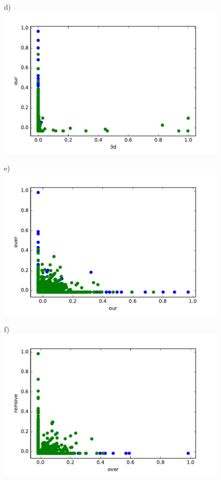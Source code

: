 \documentclass[11pt, paper=a4]{article}
\begin{document}
\begin{figure}[h]
\begin{minipage}{0.3\textwidth}
  \end{minipage} \vfill
  \begin{minipage}{0.3\textwidth}
    d)\\
    \includegraphics[width = 0.99\textwidth]{../../src/img/3d_our.pdf}
  \end{minipage} \hfill
  \begin{minipage}{0.3\textwidth}
    e)\\
    \includegraphics[width = 0.99\textwidth]{../../src/img/our_over.pdf}
  \end{minipage} \hfill
  \begin{minipage}{0.3\textwidth}
    f)\\
    \includegraphics[width = 0.99\textwidth]{../../src/img/over_remove.pdf}

\end{minipage}
\end{figure}
\end{document}
